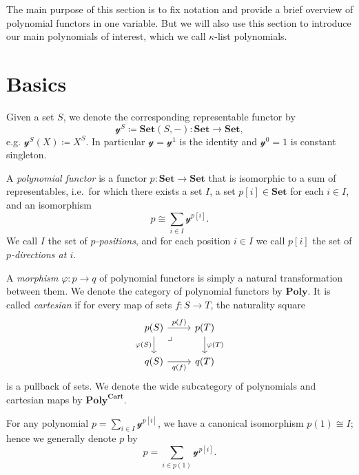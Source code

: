 \documentclass[11pt, one side, article]{memoir}
\theoremstyle{definition}
\theoremstyle{plain}
\newenvironment{definition}
  {\pushQED{\qed}\renewcommand{\qedsymbol}{$\lozenge$}\definitionx}
  {\popQED\enddefinitionx}
\newcommand{\Cat}[1]{\mathbf{#1}}%
\newcommand{\smset}{\Cat{Set}}
\newcommand{\yon}{\mathcal{y}}
\newcommand{\poly}{\Cat{Poly}}
\newcommand{\polycart}{\poly^{\Cat{Cart}}}
\newcommand{\0}{\textsf{0}}
\newcommand{\1}{\tn{\textsf{1}}}
\begin{document}
The main purpose of this section is to fix notation and provide a brief overview of polynomial functors in one variable. But we will also use this section to introduce our main polynomials of interest, which we call $\kappa$-list polynomials.

\section{Basics}

\begin{definition}[Polynomial functor]\label{def.poly}
Given a set $S$, we denote the corresponding representable functor by
\[\yon^S\coloneqq\smset(S,-)\colon\smset\to\smset,\]
e.g. $\yon^S(X)\coloneqq X^S$. In particular $\yon=\yon^1$ is the identity and $\yon^0=1$ is constant singleton.

A \emph{polynomial functor} is a functor $p\colon\smset\to\smset$ that is isomorphic to a sum of representables, i.e.\ for which there exists a set $I$, a set $p[i]\in\smset$ for each $i\in I$, and an isomorphism
\[
p\cong\sum_{i\in I}\yon^{p[i]}.
\]
We call $I$ the set of \emph{$p$-positions}, and for each position $i\in I$ we call $p[i]$ the set of \emph{$p$-directions at $i$}. 

A \emph{morphism} $\varphi\colon p\to q$ of polynomial functors is simply a natural transformation between them. We denote the category of polynomial functors by $\poly$. It is called \emph{cartesian} if for every map of sets $f\colon S\to T$, the naturality square
\[
\begin{tikzcd}
  p(S)\ar[r, "p(f)"]\ar[d, "\varphi(S)"']&p(T)\ar[d, "\varphi(T)"]\\
  q(S)\ar[r, "q(f)"']&q(T)\ar[ul, phantom, very near end, "\lrcorner"]
\end{tikzcd}
\]
is a pullback of sets. We denote the wide subcategory of polynomials and cartesian maps by $\polycart$.
\end{definition}

For any polynomial $p=\sum_{i\in I}\yon^{p[i]}$, we have a canonical isomorphism $p(1)\cong I$; hence we generally denote $p$ by
\begin{equation}\label{eqn.poly_notation}
p=\sum_{i\in p(1)}\yon^{p[i]}.
\end{equation}
\end{document}

